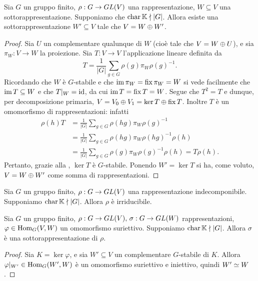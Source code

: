 \begin{proposition}
Sia $G$ un gruppo finito, $\rho:G\to GL(V)$ una rappresentazione, $W\subseteq V$ una sottorappresentazione. Supponiamo che $\operatorname{char}\mathbb{K}\nmid|G|$. Allora esiste una sottorappresentazione $W'\subseteq V$ tale che $V=W\oplus W'$.
\end{proposition}
\begin{proof}
Sia $U$ un complementare qualunque di $W$ (cioè tale che $V=W\oplus U$), e sia $\pi_W:V\to W$ la proiezione. Sia $T:V\to V$ l'applicazione lineare definita da
$$
T=\frac{1}{|G|}\sum_{g\in G}\rho(g)\pi_W\rho(g)^{-1}.
$$
Ricordando che $W$ è $G$-stabile e che $\operatorname{im}\pi_W=\operatorname{fix}\pi_W=W$ si vede facilmente che $\operatorname{im} T\subseteq W$ e che $T|_W=\operatorname{id}$, da cui $\operatorname{im} T=\operatorname{fix} T=W$. Segue che $T^2=T$ e dunque, per decomposizione primaria, $V=V_0\oplus V_1=\ker T\oplus\operatorname{fix} T$. Inoltre $T$ è un omomorfismo di rappresentazioni: infatti
\begin{align*}
\rho(h)T&=\frac{1}{|G|}\sum_{g\in G}\rho(hg)\pi_W\rho(g)^{-1}\\
&=\frac{1}{|G|}\sum_{g\in G}\rho(hg)\pi_W\rho(hg)^{-1}\rho(h)\\
&=\frac{1}{|G|}\sum_{g\in G}\rho(g)\pi_W\rho(g)^{-1}\rho(h)=T\rho(h).
\end{align*}
Pertanto, grazie alla , $\ker T$ è $G$-stabile. Ponendo $W'=\ker T$ si ha, come voluto, $V=W\oplus W'$  come somma di rappresentazioni.
\end{proof}

\begin{corollary}
Sia $G$ un gruppo finito, $\rho:G\to GL(V)$ una rappresentazione indecomponibile. Supponiamo $\operatorname{char}\mathbb{K}\nmid |G|$. Allora $\rho$ è irriducibile.
\end{corollary}

\begin{corollary}
Sia $G$ un gruppo finito, $\rho:G\to GL(V),\,\allowbreak\sigma:G\to GL(W)$ rappresentazioni, $\varphi\in\operatorname{Hom}_G(V,W)$ un omomorfismo suriettivo. Supponiamo $\operatorname{char}\mathbb{K}\nmid|G|$. Allora $\sigma$ è una sottorappresentazione di $\rho$.
\end{corollary}
\begin{proof}
Sia $K=\ker\varphi$, e sia $W'\subseteq V$ un complementare $G$-stabile di $K$. Allora $\varphi|_{W'}\in\operatorname{Hom}_G(W',W)$ è un omomorfismo suriettivo e iniettivo, quindi $W'\simeq W$.
\end{proof}


